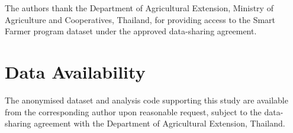 \documentclass[3p,twocolumn,authoryear]{elsarticle}
\begin{document}
The authors thank the Department of Agricultural Extension, Ministry of
Agriculture and Cooperatives, Thailand, for providing access to the
Smart Farmer program dataset under the approved data-sharing agreement.

\section*{Data Availability}

The anonymised dataset and analysis code supporting this study are
available from the corresponding author upon reasonable request, subject
to the data-sharing agreement with the Department of Agricultural
Extension, Thailand.

\end{document}
